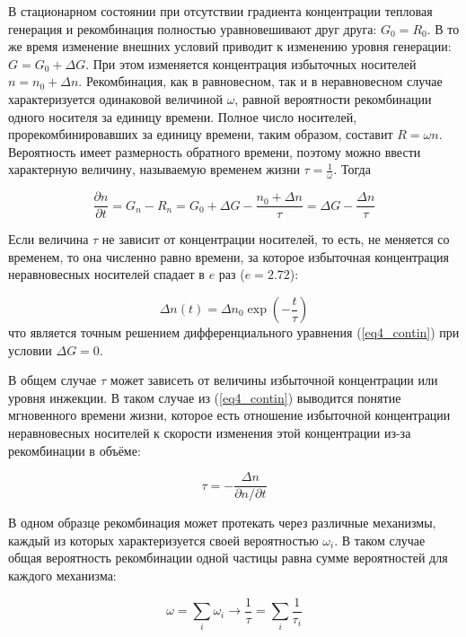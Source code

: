В стационарном состоянии при отсутствии градиента концентрации тепловая генерация и рекомбинация полностью уравновешивают друг друга: $G_{0} = R_{0}$. В то же время изменение внешних условий приводит к изменению уровня генерации: $G = G_{0} + \Delta G$. При этом изменяется концентрация избыточных носителей $n = n_{0} + \Delta n$. Рекомбинация, как в равновесном, так и в неравновесном случае характеризуется одинаковой величиной $\omega$, равной вероятности рекомбинации одного носителя за единицу времени. Полное число носителей, прорекомбинировавших за единицу времени, таким образом, составит $R = \omega n$. Вероятность имеет размерность обратного времени, поэтому можно ввести характерную величину, называемую временем жизни $\tau = \frac{1}{\omega}$. Тогда

\begin{equation}
\frac{\partial n}{\partial t} = G_{n} - R_{n} = G_{0} + \Delta G - \frac{n_{0} + \Delta n}{\tau} = \Delta G - \frac{\Delta n}{\tau}
\label{eq4_contin}
\end{equation}

Если величина $\tau$ не зависит от концентрации носителей, то есть, не меняется со временем, то она численно равно времени, за которое избыточная концентрация неравновесных носителей спадает в $e$ раз ($e = 2.72$):

\begin{equation}
\Delta n(t) = \Delta n_{0} \exp \left( -\frac{t}{\tau} \right)
\end{equation}
что является точным решением дифференциального уравнения (\ref{eq4_contin}) при условии $\Delta G = 0$.

В общем случае $\tau$ может зависеть от величины избыточной концентрации или уровня инжекции. В таком случае из (\ref{eq4_contin}) выводится понятие мгновенного времени жизни, которое есть отношение избыточной концентрации неравновесных носителей к скорости изменения этой концентрации из-за рекомбинации в объёме:

\begin{equation}
\tau = -\frac{\Delta n}{\partial n / \partial t}
\end{equation}

В одном образце рекомбинация может протекать через различные механизмы, каждый из которых характеризуется своей вероятностью $\omega_{i}$. В таком случае общая вероятность рекомбинации одной частицы равна сумме вероятностей для каждого механизма:

\begin{equation}
\omega = \sum\limits_{i} {\omega_{i}} \rightarrow \frac{1}{\tau} = \sum\limits_{i} {\frac{1}{\tau_{i}}}
\end{equation}

